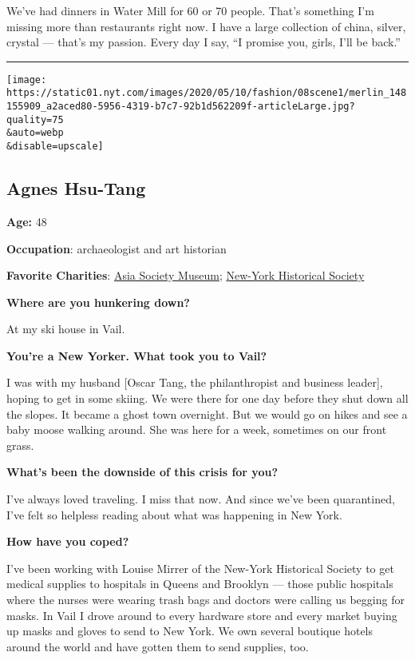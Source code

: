 We've had dinners in Water Mill for 60 or 70 people. That's something
I'm missing more than restaurants right now. I have a large collection
of china, silver, crystal --- that's my passion. Every day I say, ``I
promise you, girls, I'll be back.''

\begin{center}\rule{0.5\linewidth}{\linethickness}\end{center}

\texttt{[image: https://static01.nyt.com/images/2020/05/10/fashion/08scene1/merlin\_148155909\_a2aced80-5956-4319-b7c7-92b1d562209f-articleLarge.jpg?quality=75\\\&auto=webp\\\&disable=upscale]}

\hypertarget{agnes-hsu-tang}{%
\subsection{Agnes Hsu-Tang}\label{agnes-hsu-tang}}

\textbf{Age:} 48

\textbf{Occupation}: archaeologist and art historian

\textbf{Favorite Charities}: \href{https://asiasociety.org/museum}{Asia
Society Museum}; \href{https://www.nyhistory.org}{New-York Historical
Society}

\textbf{Where are you hunkering down?}

At my ski house in Vail.

\textbf{You're a New Yorker. What took you to Vail?}

I was with my husband {[}Oscar Tang, the philanthropist and business
leader{]}, hoping to get in some skiing. We were there for one day
before they shut down all the slopes. It became a ghost town overnight.
But we would go on hikes and see a baby moose walking around. She was
here for a week, sometimes on our front grass.

\textbf{What's been the downside of this crisis for you?}

I've always loved traveling. I miss that now. And since we've been
quarantined, I've felt so helpless reading about what was happening in
New York.

\textbf{How have you coped?}

I've been working with Louise Mirrer of the New-York Historical Society
to get medical supplies to hospitals in Queens and Brooklyn --- those
public hospitals where the nurses were wearing trash bags and doctors
were calling us begging for masks. In Vail I drove around to every
hardware store and every market buying up masks and gloves to send to
New York. We own several boutique hotels around the world and have
gotten them to send supplies, too.

